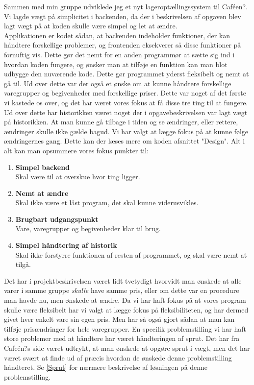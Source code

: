 \documentclass[]{article}
\begin{document}
Sammen med min gruppe udviklede jeg et nyt lageroptællingssystem til Caféen?. \\
Vi lagde vægt på simplicitet i backenden, da der i beskrivelsen af opgaven blev lagt vægt på at koden skulle være simpel og let at ændre. \\
Applikationen er kodet sådan, at backenden indeholder funktioner, der kan håndtere forskellige problemer, og frontenden eksekverer så disse funktioner på fornuftig vis. Dette gør det nemt for en anden programmør at sætte sig ind i hvordan koden fungere, og ønsker man at tilføje en funktion kan man blot udbygge den nuværende kode. Dette gør programmet yderst fleksibelt og nemt at gå til. Ud over dette var der også et ønske om at kunne håndtere forskellige varegrupper og begivenheder med forskellige priser. Dette var noget af det første vi kastede os over, og det har været vores fokus at få disse tre ting til at fungere. Ud over dette har historikken været noget der i opgavebeskrivelsen var lagt vægt på historikken. At man kunne gå tilbage i tiden og se ændringer, eller rettere, ændringer skulle ikke gælde bagud. Vi har valgt at lægge fokus på at kunne følge ændringernes gang. Dette kan der læses mere om koden afsnittet "Design". Alt i alt kan man opsummere vores fokus punkter til: 
\begin{enumerate}
	\item \textbf{Simpel backend} \\ Skal være til at overskue hvor ting ligger.
	\item \textbf{Nemt at ændre} \\ Skal ikke være et låst program, det skal kunne viderusvikles.
	\item \textbf{Brugbart udgangspunkt} \\ Vare, varegrupper og begivenheder klar til brug.
	\item \textbf{Simpel håndtering af historik} \\ Skal ikke forstyrre funktionen af resten af programmet, og skal være nemt at tilgå. 
\end{enumerate}
Det har i projektbeskrivelsen været lidt tvetydigt hvorvidt man ønskede at alle varer i samme gruppe \textit{skulle} have samme pris, eller om dette var en procedure man havde nu, men ønskede at ændre. Da vi har haft fokus på at vores program skulle være fleksibelt har vi valgt at lægge fokus på fleksibiliteten, og har dermed givet hver enkelt vare sin egen pris. Men har så også gjort sådan at man kan tilføje prisændringer for hele varegrupper. En specifik problemstilling vi har haft store problemer med at håndtere har været håndteringen af sprut. Det har fra Cafeén?s side været udtrykt, at man ønskede at opgøre sprut i vægt, men det har været svært at finde ud af præcis hvordan de ønskede denne problemstilling håndteret. Se \ref{Sprut} for nærmere beskrivelse af løsningen på denne problemstilling. 
\pagebreak[3]
\end{document}
